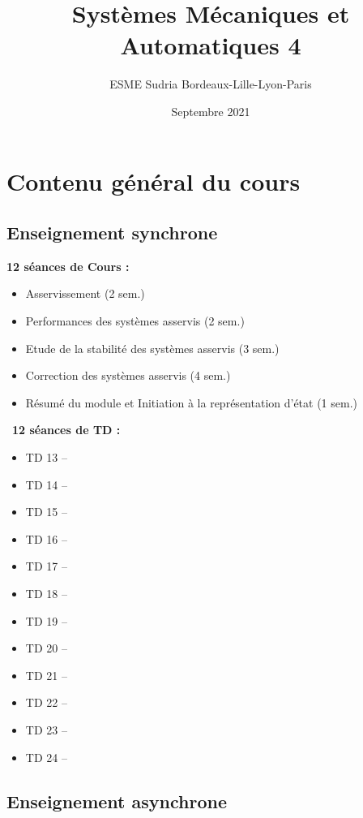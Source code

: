 \documentclass[a4paper,11pt]{article}
\title{Systèmes Mécaniques et Automatiques 4}
\date{Septembre 2021}
\author{ESME Sudria Bordeaux-Lille-Lyon-Paris}
\begin{document}
\maketitle

\section*{Contenu général du cours}

\subsection*{Enseignement synchrone}

\noindent \textbf{12 séances de Cours :}
\begin{itemize}
    \item Asservissement                                 \hfill (2 sem.)
    \item Performances des systèmes asservis             \hfill (2 sem.)
    \item Etude de la stabilité des systèmes asservis    \hfill (3 sem.)
    \item Correction des systèmes asservis               \hfill (4 sem.)
    \item Résumé du module et Initiation à la représentation d'état  \hfill (1 sem.)
\end{itemize}
$\,$\newline
\noindent \textbf{12 séances de TD :}
\begin{itemize}
    \item TD 13 -- 
    \item TD 14 -- 
    \item TD 15 -- 
    \item TD 16 -- 
    \item TD 17 -- 
    \item TD 18 -- 
    \item TD 19 -- 
    \item TD 20 -- 
    \item TD 21 -- 
    \item TD 22 -- 
    \item TD 23 -- 
    \item TD 24 -- 
\end{itemize}


\subsection*{Enseignement asynchrone}
\end{document}
